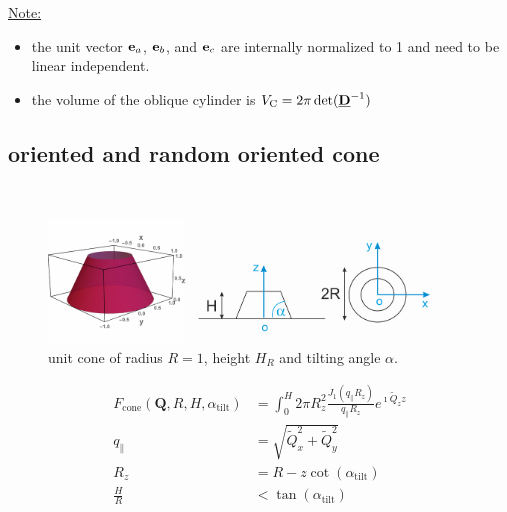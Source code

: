 \noindent\underline{Note:}
\begin{itemize}
\item the unit vector $\B{e}_a$, $\B{e}_b$, and $\B{e}_c$ are internally normalized to 1 and need to be linear independent.
\item the volume of the oblique cylinder is $V_\mathrm{C}=2\pi\det(\M{D}^{-1})$
\end{itemize}

\subsection{oriented and random oriented cone} ~\\
\cite{Renaud2009}
\begin{figure}[htb]
\begin{center}
\includegraphics[width=0.9\textwidth]{../images/form_factor/oriented_primitive_opbjects/cone.png}
\end{center}
\caption{unit cone of radius $R=1$, height $H_R$ and  tilting angle $\alpha$.}
\label{fig:opo_cone}
\end{figure}


\begin{align}\label{eq:opo_cone}
  F_\mathrm{cone}(\mathbf{Q},R,H,\alpha_\mathrm{tilt}) & = \int_0^H2\pi R_z^2 \frac{J_1\left(q_\parallel R_z\right)}{q_\parallel R_z}  e^{\imath \tilde{Q}_z z} \\
  q_\parallel &= \sqrt{\tilde{Q}_x^2+\tilde{Q}_y^2} \\
  R_z &=R-z\cot(\alpha_\mathrm{tilt}) \\
  \frac{H}{R} &< \tan(\alpha_\mathrm{tilt})
\end{align}

